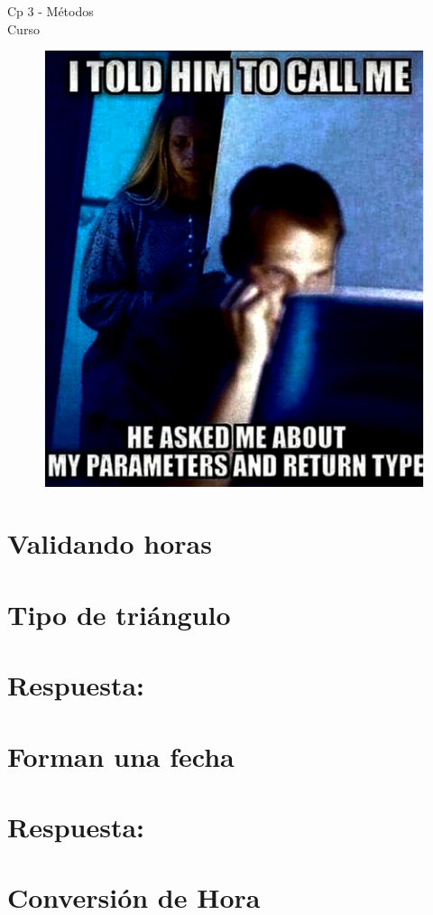 \begin{center}
    \begin{large}
    Cp 3 - Métodos\\
    Curso \academicyear\\
    \end{large}
    \begin{figure}[h]
    	\centering
    	\includegraphics[width=0.4\linewidth]{cp3/methods.png}
    \end{figure}
\end{center}

\section{Validando horas}


\section{Tipo de triángulo}

\ifshowanswers
\section*{Respuesta:}

\fi

\section{Forman una fecha}

\ifshowanswers
\section*{Respuesta:}

\fi

\section{Conversión de Hora} 


